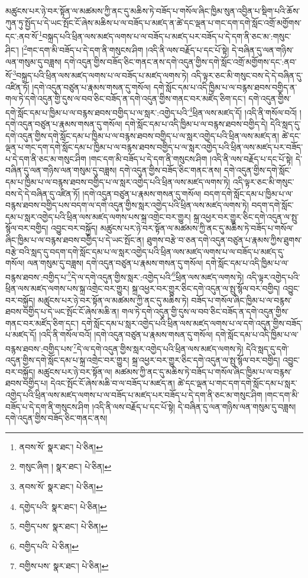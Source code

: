 མཚུངས་པར་ཉེ་བར་སྟོན་ལ་མཚམས་ཀྱི་ནང་དུ་མཆིས་ཏེ་བཟོད་པ་གསོལ་ཞིང་ཁྱིམ་སུན་འབྱིན་པ་སྡིག་པའི་ཆོས་ཀུན་ཏུ་སྤྱོད་པ་དེ་ཡང་སྤོང་ངོ་ཞེས་མཆིས་པ་ལ་བཟོད་པ་མཛད་ན་ཚེ་དང་ལྡན་པ་གང་དག་དགེ་སློང་འགྲོ་མགྱོགས་དང་:ནབ་སོ་\footnote{ནབས་སོ་  སྣར་ཐང་།  པེ་ཅིན། }བསྐྲད་པའི་ཕྲིན་ལས་མཛད་ལགས་པ་ལ་བཟོད་པ་མཛད་པར་བཟོད་པ་དེ་དག་ནི་ཅང་མ་:གསུང་ཤིང་། །\footnote{གསུང་ཞིག །  སྣར་ཐང་།  པེ་ཅིན། }གང་དག་མི་བཟོད་པ་དེ་དག་ནི་གསུངས་ཤིག །འདི་ནི་ལས་བརྗོད་པ་དང་པོ་སྟེ། དེ་བཞིན་དུ་ལན་གཉིས་ལན་གསུམ་དུ་བཟླས། དགེ་འདུན་གྱིས་བཟོད་ཅིང་གནང་ནས་དགེ་འདུན་གྱིས་དགེ་སློང་འགྲོ་མགྱོགས་དང་:ནབ་སོ་\footnote{ནབས་སོ་  སྣར་ཐང་།  པེ་ཅིན། }བསྐྲད་པའི་ཕྲིན་ལས་མཛད་ལགས་པ་ལ་བཟོད་པ་མཛད་ལགས་ཏེ། འདི་ལྟར་ཅང་མི་གསུང་བས་དེ་དེ་བཞིན་དུ་འཛིན་ཏོ། །དགེ་འདུན་བཙུན་པ་རྣམས་གསན་དུ་གསོལ། དགེ་སློང་དམ་པ་འདི་ཁྱིམ་པ་ལ་བརྙས་ཐབས་བགྱིད་ན་གལ་ཏེ་དགེ་འདུན་གྱི་དུས་ལ་བབ་ཅིང་བཟོད་ན་དགེ་འདུན་གྱིས་གནང་བར་མཛོད་ཅིག་དང་། དགེ་འདུན་གྱིས་དགེ་སློང་དམ་པ་ཁྱིམ་པ་ལ་བརྙས་ཐབས་བགྱིད་པ་ལ་སླར་:འགྱེད་པའི་\footnote{དགྱེད་པའི་  སྣར་ཐང་།  པེ་ཅིན། }ཕྲིན་ལས་མཛད་དོ། །འདི་ནི་གསོལ་བའོ། །དགེ་འདུན་བཙུན་པ་རྣམས་གསན་དུ་གསོལ། དགེ་སློང་དམ་པ་འདི་ཁྱིམ་པ་ལ་བརྙས་ཐབས་བགྱིད་དེ། དེའི་སླད་དུ་དགེ་འདུན་གྱིས་དགེ་སློང་དམ་པ་ཁྱིམ་པ་ལ་བརྙས་ཐབས་བགྱིད་པ་ལ་སླར་འགྱེད་པའི་ཕྲིན་ལས་མཛད་ན། ཚེ་དང་ལྡན་པ་གང་དག་དགེ་སློང་དམ་པ་ཁྱིམ་པ་ལ་བརྙས་ཐབས་བགྱིད་པ་ལ་སླར་འགྱེད་པའི་ཕྲིན་ལས་མཛད་པར་བཟོད་པ་དེ་དག་ནི་ཅང་མ་གསུང་ཤིག །གང་དག་མི་བཟོད་པ་དེ་དག་ནི་གསུངས་ཤིག །འདི་ནི་ལས་བརྗོད་པ་དང་པོ་སྟེ། དེ་བཞིན་དུ་ལན་གཉིས་ལན་གསུམ་དུ་བཟླས། དགེ་འདུན་གྱིས་བཟོད་ཅིང་གནང་ནས། དགེ་འདུན་གྱིས་དགེ་སློང་དམ་པ་ཁྱིམ་པ་ལ་བརྙས་ཐབས་བགྱིད་པ་ལ་སླར་འགྱེད་པའི་ཕྲིན་ལས་མཛད་ལགས་ཏེ། འདི་ལྟར་ཅང་མི་གསུང་བས་དེ་དེ་བཞིན་དུ་འཛིན་ཏོ། །དགེ་འདུན་བཙུན་པ་རྣམས་གསན་དུ་གསོལ། བདག་དགེ་སློང་དམ་པ་ཁྱིམ་པ་ལ་བརྙས་ཐབས་བགྱིད་པས་བདག་ལ་དགེ་འདུན་གྱིས་སླར་འགྱེད་པའི་ཕྲིན་ལས་མཛད་ལགས་ཏེ། བདག་དགེ་སློང་དམ་པ་སླར་འགྱེད་པའི་ཕྲིན་ལས་མཛད་ལགས་པས་སྐྲ་འགྲེང་བར་གྱུར། སྐྲ་འཕྱར་བར་གྱུར་ཅིང་དགེ་འདུན་ལ་སྤུ་སྙོལ་བར་བགྱིད། འབྱུང་བར་བསྐྱོད། མཚུངས་པར་ཉེ་བར་སྟོན་ལ་མཚམས་ཀྱི་ནང་དུ་མཆིས་ཏེ་བཟོད་པ་གསོལ་ཞིང་ཁྱིམ་པ་ལ་བརྙས་ཐབས་བགྱིད་པ་དེ་ཡང་སྤོང་ན། ཐུགས་བརྩེ་བ་ཅན་དགེ་འདུན་བཙུན་པ་རྣམས་ཀྱིས་ཐུགས་བརྩེ་བའི་སླད་དུ་བདག་དགེ་སློང་དམ་པ་ལ་སླར་འགྱེད་པའི་ཕྲིན་ལས་མཛད་ལགས་པ་ལ་བཟོད་པ་མཛད་དུ་གསོལ། ལན་གསུམ་དུ་བཟླས། དགེ་འདུན་བཙུན་པ་རྣམས་གསན་དུ་གསོལ། དགེ་སློང་དམ་པ་འདི་ཁྱིམ་པ་ལ་བརྙས་ཐབས་:བགྱིད་པ་\footnote{བགྱིད་པས་  སྣར་ཐང་།  པེ་ཅིན། }དེ་ལ་དགེ་འདུན་གྱིས་སླར་:འགྱེད་པའི་\footnote{བགྱིད་པའི་  པེ་ཅིན། }ཕྲིན་ལས་མཛད་ལགས་ཏེ། འདི་ལྟར་འགྱེད་པའི་ཕྲིན་ལས་མཛད་ལགས་པས་སྐྲ་འགྲེང་བར་གྱུར། སྐྲ་འཕྱར་བར་གྱུར་ཅིང་དགེ་འདུན་ལ་སྤུ་སྙོལ་བར་བགྱིད། འབྱུང་བར་བསྐྱོད། མཚུངས་པར་ཉེ་བར་སྟོན་ལ་མཚམས་ཀྱི་ནང་དུ་མཆིས་ཏེ། བཟོད་པ་གསོལ་ཞིང་ཁྱིམ་པ་ལ་བརྙས་ཐབས་བགྱིད་པ་དེ་ཡང་སྤོང་ངོ་ཞེས་མཆི་ན། གལ་ཏེ་དགེ་འདུན་གྱི་དུས་ལ་བབ་ཅིང་བཟོད་ན་དགེ་འདུན་གྱིས་གནང་བར་མཛོད་ཅིག་དང་། དགེ་སློང་དམ་པ་སླར་འགྱེད་པའི་ཕྲིན་ལས་མཛད་ལགས་པ་ལ་དགེ་འདུན་གྱིས་བཟོད་པ་མཛད་དོ། །འདི་ནི་གསོལ་བའོ། །དགེ་འདུན་བཙུན་པ་རྣམས་གསན་དུ་གསོལ། དགེ་སློང་དམ་པ་འདི་ཁྱིམ་པ་ལ་བརྙས་ཐབས་:བགྱིད་པས་\footnote{བགྱིས་པས་  སྣར་ཐང་།  པེ་ཅིན། }དེ་ལ་དགེ་འདུན་གྱིས་སླར་འགྱེད་པའི་ཕྲིན་ལས་མཛད་ལགས་ཏེ། དེའི་སླད་དུ་དགེ་འདུན་གྱིས་དགེ་སློང་དམ་པ་སྐྲ་འགྲེང་བར་གྱུར། སྐྲ་འཕྱར་བར་གྱུར་ཅིང་དགེ་འདུན་ལ་སྤུ་སྙོལ་བར་བགྱིད། འབྱུང་བར་བསྐྱོད། མཚུངས་པར་ཉེ་བར་སྟོན་ལ། མཚམས་ཀྱི་ནང་དུ་མཆིས་ཏེ་བཟོད་པ་གསོལ་ཞིང་ཁྱིམ་པ་ལ་བརྙས་ཐབས་བགྱིད་པ། དེའང་སྤོང་ངོ་ཞེས་མཆི་བ་ལ་བཟོད་པ་མཛད་ན། ཚེ་དང་ལྡན་པ་གང་དག་དགེ་སློང་དམ་པ་སླར་འགྱེད་པའི་ཕྲིན་ལས་མཛད་ལགས་པ་ལ་བཟོད་པ་མཛད་པར་བཟོད་པ་དེ་དག་ནི་ཅང་མ་གསུང་ཤིག །གང་དག་མི་བཟོད་པ་དེ་དག་ནི་གསུངས་ཤིག །འདི་ནི་ལས་བརྗོད་པ་དང་པོ་སྟེ། དེ་བཞིན་དུ་ལན་གཉིས་ལན་གསུམ་དུ་བཟླས། དགེ་འདུན་གྱིས་བཟོད་ཅིང་གནང་ནས། 